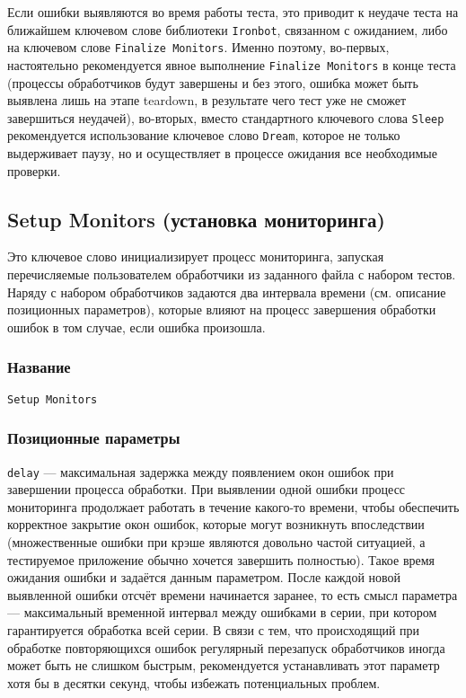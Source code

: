 \documentclass[11pt]{book} %
\begin{document}
Если ошибки выявляются во время работы теста, это приводит к неудаче теста на ближайшем ключевом слове библиотеки \verb|Ironbot|, связанном с ожиданием, либо на ключевом слове \verb|Finalize Monitors|. Именно поэтому, во-первых, настоятельно рекомендуется явное выполнение \verb|Finalize Monitors| в конце теста (процессы обработчиков будут завершены и без этого, ошибка может быть выявлена лишь на этапе teardown, в результате чего тест уже не сможет завершиться неудачей), во-вторых, вместо стандартного ключевого слова \verb|Sleep| рекомендуется использование ключевое слово \verb|Dream|, которое не только выдерживает паузу, но и осуществляет в процессе ожидания все необходимые проверки. 



\subsection{Setup Monitors (установка мониторинга)}
Это ключевое слово инициализирует процесс мониторинга, запуская перечисляемые пользователем обработчики из заданного файла с набором тестов. Наряду с набором обработчиков задаются два интервала времени (см. описание позиционных параметров), которые влияют на процесс завершения обработки ошибок в том случае, если ошибка произошла.

\subsubsection*{Название} 
\verb"Setup Monitors"

\subsubsection*{Позиционные параметры} 
\verb"delay" --- максимальная задержка между появлением окон ошибок при завершении процесса обработки. При выявлении одной ошибки процесс мониторинга продолжает работать в течение какого-то времени, чтобы обеспечить корректное закрытие окон ошибок, которые могут возникнуть впоследствии (множественные ошибки при крэше являются довольно частой ситуацией, а тестируемое приложение обычно хочется завершить полностью). Такое время ожидания ошибки и задаётся данным параметром. После каждой новой выявленной ошибки отсчёт времени начинается заранее, то есть смысл параметра --- максимальный временной интервал между ошибками в серии, при котором гарантируется обработка всей серии. В связи с тем, что происходящий при обработке повторяющихся ошибок регулярный перезапуск обработчиков иногда может быть не слишком быстрым, рекомендуется устанавливать этот параметр хотя бы в десятки секунд, чтобы избежать потенциальных проблем.
\end{document}
